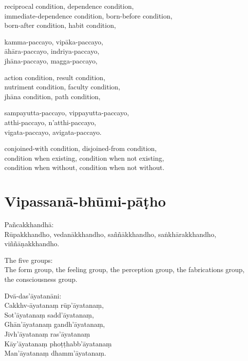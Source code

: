 \begin{english}
  reciprocal condition, dependence condition,\\
  immediate-dependence condition, born-before condition,\\
  born-after condition, habit condition,
\end{english}

kamma-paccayo, vipāka-paccayo,\\
āhāra-paccayo, indriya-paccayo,\\
jhāna-paccayo, magga-paccayo,

\begin{english}
  action condition, result condition,\\
  nutriment condition, faculty condition,\\
  jhāna condition, path condition,
\end{english}

sampayutta-paccayo, vippayutta-paccayo,\\
atthi-paccayo, n'atthi-paccayo,\\
vigata-paccayo, avigata-paccayo.

\begin{english}
  conjoined-with condition, disjoined-from condition,\\
  condition when existing, condition when not existing,\\
  condition when without, condition when not without.
\end{english}


\section{Vipassanā-bhūmi-pāṭho}



Pañcakkhandhā:\\
Rūpakkhandho, vedanākkhandho, saññākkhandho, saṅkhārakkhandho, viññāṇakkhandho.

\begin{english}
  The five groups:\\
  The form group, the feeling group, the perception group, the fabrications
  group, the consciousness group.
\end{english}

Dvā-das'āyatanāni:\\
Cakkhv-āyatanaṃ rūp'āyatanaṃ,\\
Sot'āyatanaṃ sadd'āyatanaṃ,\\
Ghān'āyatanaṃ gandh'āyatanaṃ,\\
Jivh'āyatanaṃ ras'āyatanaṃ\\
Kāy'āyatanaṃ phoṭṭhabb'āyatanaṃ\\
Man'āyatanaṃ dhamm'āyatanaṃ.

